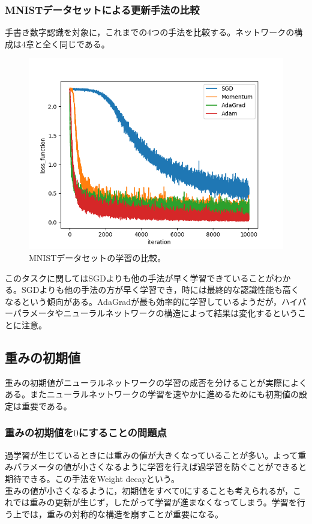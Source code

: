 \documentclass{jarticle}
\begin{document}
\subsubsection{MNISTデータセットによる更新手法の比較}
手書き数字認識を対象に，これまでの4つの手法を比較する。ネットワークの構成は$4$章と全く同じである。
\begin{figure}[htbp]
	\begin{center}
		\includegraphics[scale = 0.5]{optimize_mnist.png}
		\caption{MNISTデータセットの学習の比較。}
		\label{optimize_mnist}
	\end{center}
\end{figure}
このタスクに関してはSGDよりも他の手法が早く学習できていることがわかる。SGDよりも他の手法の方が早く学習でき，時には最終的な認識性能も高くなるという傾向がある。AdaGradが最も効率的に学習しているようだが，ハイパーパラメータやニューラルネットワークの構造によって結果は変化するということに注意。

\subsection{重みの初期値}
重みの初期値がニューラルネットワークの学習の成否を分けることが実際によくある。またニューラルネットワークの学習を速やかに進めるためにも初期値の設定は重要である。
\subsubsection{重みの初期値を$0$にすることの問題点}
過学習が生じているときには重みの値が大きくなっていることが多い。よって重みパラメータの値が小さくなるように学習を行えば過学習を防ぐことができると期待できる。この手法をWeight decayという。\\
重みの値が小さくなるように，初期値をすべて$0$にすることも考えられるが，これでは重みの更新が生じず，したがって学習が進まなくなってしまう。学習を行う上では，重みの対称的な構造を崩すことが重要になる。
\end{document}
